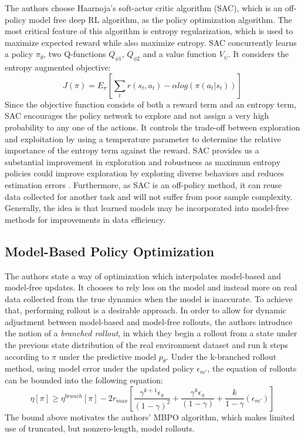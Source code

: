\documentclass{article}
\begin{document}
The authors choose Haarnoja's soft-actor critic algorithm (SAC), which is an off-policy model free deep RL algorithm, as the policy optimization algorithm. The most critical feature of this algorithm is entropy regularization, which is used to maximize expected reward while also maximize entropy. 
SAC concurrently learns a policy $\pi_{\theta}$, two Q-functions $Q_{\phi 1}$, $Q_{\phi 2}$ and a value function $V_{\psi}$. It considers the entropy augmented objective:
$$J(\pi) = E_{\pi} \left[\sum_{t}r(s_{t},a_{t}) - \alpha log(\pi(a_{t}|s_{t}))\right]$$
Since the objective function consists of both a reward term and an entropy term, SAC encourages the policy network to explore and not assign a very high probability to any one of the actions. It controls the trade-off between exploration and exploitation by using a temperature parameter to determine the relative importance of the entropy term against the reward. SAC provides us a substantial improvement in exploration and robustness as maximum entropy policies could improve exploration by exploring diverse behaviors and reduces estimation errors \cite{ref8}. Furthermore, as SAC is an off-policy method, it can reuse data collected for another task and will not suffer from poor sample complexity. Generally, the idea is that learned models may be incorporated into model-free methods for improvements in data
efficiency.

\subsection{Model-Based Policy Optimization}

The authors state a way of optimization which interpolates model-based and model-free updates. It chooses to rely less on the model and instead more on real data collected from the true dynamics when the model is inaccurate. To achieve that, performing rollout is a desirable approach. In order to allow for dynamic adjustment between model-based and model-free rollouts, the authors introduce the notion of a \textit{branched rollout}, in which they begin a rollout from a state under the previous state distribution of the real environment dataset and run k steps according to $\pi$ under the predictive model $p_{\theta}$. Under the k-branched rollout method, using model error under the updated policy $\epsilon_{m'}$, the equation of rollouts can be bounded into the following equation:
$$
    \eta[\pi] \geq \eta^{branch}[\pi] - 2r_{max}[\frac{\gamma^{k+1}\epsilon_{\pi}}{(1-\gamma)^2} + \frac{\gamma^{k}\epsilon_{\pi}}{(1-\gamma)} + \frac{k}{1-\gamma}(\epsilon_{m'})]
$$
The bound above motivates the authors' MBPO algorithm, which makes limited use of truncated, but nonzero-length, model rollouts.\\
\end{document}
